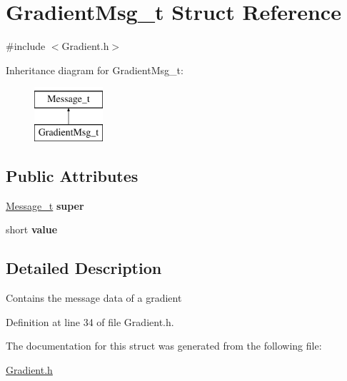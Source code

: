 \hypertarget{structGradientMsg__t}{
\section{GradientMsg\_\-t Struct Reference}
\label{structGradientMsg__t}
}


{\ttfamily \#include $<$Gradient.h$>$}

Inheritance diagram for GradientMsg\_\-t:\begin{figure}[H]
\begin{center}
\leavevmode
\includegraphics[height=2.000000cm]{structGradientMsg__t}
\end{center}
\end{figure}
\subsection*{Public Attributes}
\begin{DoxyCompactItemize}
\item 
\hypertarget{structGradientMsg__t_a956bdbe01b35b74630b602040d27ca9e}{
\hyperlink{structMessage__t}{Message\_\-t} {\bfseries super}}
\label{structGradientMsg__t_a956bdbe01b35b74630b602040d27ca9e}

\item 
\hypertarget{structGradientMsg__t_a7086649daa8681fdcf42fb36dc07d84d}{
short {\bfseries value}}
\label{structGradientMsg__t_a7086649daa8681fdcf42fb36dc07d84d}

\end{DoxyCompactItemize}


\subsection{Detailed Description}
Contains the message data of a gradient 

Definition at line 34 of file Gradient.h.



The documentation for this struct was generated from the following file:\begin{DoxyCompactItemize}
\item 
\hyperlink{Gradient_8h}{Gradient.h}\end{DoxyCompactItemize}
